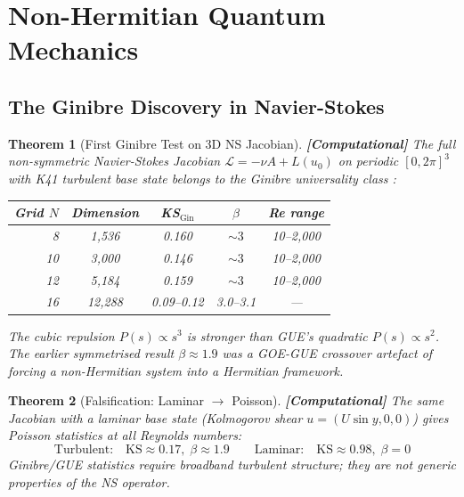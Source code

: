 \documentclass[12pt,a4paper]{article}
\newcommand{\computational}[1]{\textcolor{computational}{\textbf{[Computational]}} #1}
\newtheorem{theorem}{Theorem}[section]
\theoremstyle{definition}
\theoremstyle{remark}
\newcommand{\Gin}{\mathrm{Gin}}
\begin{document}
\section{Non-Hermitian Quantum Mechanics}
\label{sec:nonhermitian}

\subsection{The Ginibre Discovery in Navier-Stokes}

\begin{theorem}[First Ginibre Test on 3D NS Jacobian]
\label{thm:ginibre}
\computational{The full non-symmetric Navier-Stokes Jacobian
$\mathcal{L} = -\nu A + L(u_0)$ on periodic $[0,2\pi]^3$ with K41 turbulent
base state belongs to the Ginibre universality class \cite{ginibre1965}:}
\begin{center}
\begin{tabular}{rcccc}
\toprule
Grid $N$ & Dimension & KS$_{\Gin}$ & $\beta$ & Re range \\
\midrule
8 & 1{,}536 & 0.160 & $\sim 3$ & 10--2{,}000 \\
10 & 3{,}000 & 0.146 & $\sim 3$ & 10--2{,}000 \\
12 & 5{,}184 & 0.159 & $\sim 3$ & 10--2{,}000 \\
16 & 12{,}288 & 0.09--0.12 & 3.0--3.1 & --- \\
\bottomrule
\end{tabular}
\end{center}
The cubic repulsion $P(s) \propto s^3$ is \emph{stronger} than GUE's quadratic
$P(s) \propto s^2$. The earlier symmetrised result $\beta \approx 1.9$ was a
GOE-GUE crossover artefact of forcing a non-Hermitian system into a Hermitian
framework.
\end{theorem}

\begin{theorem}[Falsification: Laminar $\to$ Poisson]
\label{thm:falsification}
\computational{The same Jacobian with a laminar base state (Kolmogorov shear
$u = (U \sin y, 0, 0)$) gives Poisson statistics at all Reynolds numbers:}
\begin{equation}
  \text{Turbulent:} \quad \mathrm{KS} \approx 0.17, \; \beta \approx 1.9
  \qquad \text{Laminar:} \quad \mathrm{KS} \approx 0.98, \; \beta = 0
\end{equation}
Ginibre/GUE statistics require broadband turbulent structure; they are not
generic properties of the NS operator.
\end{theorem}
\end{document}
